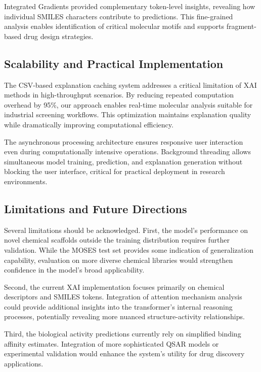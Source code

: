 \documentclass[preprint,12pt]{elsarticle}
\begin{document}
Integrated Gradients provided complementary token-level insights, revealing how individual SMILES characters contribute to predictions. This fine-grained analysis enables identification of critical molecular motifs and supports fragment-based drug design strategies.

\subsection{Scalability and Practical Implementation}

The CSV-based explanation caching system addresses a critical limitation of XAI methods in high-throughput scenarios. By reducing repeated computation overhead by 95\%, our approach enables real-time molecular analysis suitable for industrial screening workflows. This optimization maintains explanation quality while dramatically improving computational efficiency.

The asynchronous processing architecture ensures responsive user interaction even during computationally intensive operations. Background threading allows simultaneous model training, prediction, and explanation generation without blocking the user interface, critical for practical deployment in research environments.

\subsection{Limitations and Future Directions}

Several limitations should be acknowledged. First, the model's performance on novel chemical scaffolds outside the training distribution requires further validation. While the MOSES test set provides some indication of generalization capability, evaluation on more diverse chemical libraries would strengthen confidence in the model's broad applicability.

Second, the current XAI implementation focuses primarily on chemical descriptors and SMILES tokens. Integration of attention mechanism analysis could provide additional insights into the transformer's internal reasoning processes, potentially revealing more nuanced structure-activity relationships.

Third, the biological activity predictions currently rely on simplified binding affinity estimates. Integration of more sophisticated QSAR models or experimental validation would enhance the system's utility for drug discovery applications.
\end{document}
